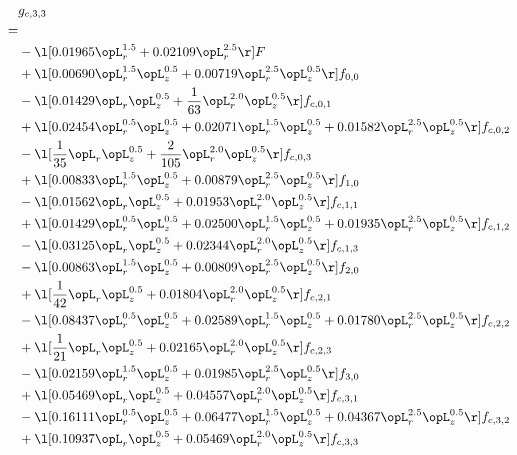 \begin{alignat}{2} 
\label{eq:g_33_0} 
& g_{c,3,3} \nonumber \\ 
 = \\ 
& - \l[  0.01965 \opL_r^{1.5} +  0.02109 \opL_r^{2.5}  \r] F \nonumber \\ 
& + \l[  0.00690 \opL_r^{1.5} \opL_z^{0.5} +  0.00719 \opL_r^{2.5} \opL_z^{0.5}  \r] f_{0,0} \nonumber \\ 
& - \l[  0.01429 \opL_r \opL_z^{0.5} + \frac{1}{63} \opL_r^{2.0} \opL_z^{0.5}  \r] f_{c,0,1} \nonumber \\ 
& + \l[  0.02454 \opL_r^{0.5} \opL_z^{0.5} +  0.02071 \opL_r^{1.5} \opL_z^{0.5} +  0.01582 \opL_r^{2.5} \opL_z^{0.5}  \r] f_{c,0,2} \nonumber \\ 
& - \l[ \frac{1}{35} \opL_r \opL_z^{0.5} + \frac{2}{105} \opL_r^{2.0} \opL_z^{0.5}  \r] f_{c,0,3} \nonumber \\ 
& + \l[  0.00833 \opL_r^{1.5} \opL_z^{0.5} +  0.00879 \opL_r^{2.5} \opL_z^{0.5}  \r] f_{1,0} \nonumber \\ 
& - \l[  0.01562 \opL_r \opL_z^{0.5} +  0.01953 \opL_r^{2.0} \opL_z^{0.5}  \r] f_{c,1,1} \nonumber \\ 
& + \l[  0.01429 \opL_r^{0.5} \opL_z^{0.5} +  0.02500 \opL_r^{1.5} \opL_z^{0.5} +  0.01935 \opL_r^{2.5} \opL_z^{0.5}  \r] f_{c,1,2} \nonumber \\ 
& - \l[  0.03125 \opL_r \opL_z^{0.5} +  0.02344 \opL_r^{2.0} \opL_z^{0.5}  \r] f_{c,1,3} \nonumber \\ 
& - \l[  0.00863 \opL_r^{1.5} \opL_z^{0.5} +  0.00809 \opL_r^{2.5} \opL_z^{0.5}  \r] f_{2,0} \nonumber \\ 
& + \l[ \frac{1}{42} \opL_r \opL_z^{0.5} +  0.01804 \opL_r^{2.0} \opL_z^{0.5}  \r] f_{c,2,1} \nonumber \\ 
& - \l[  0.08437 \opL_r^{0.5} \opL_z^{0.5} +  0.02589 \opL_r^{1.5} \opL_z^{0.5} +  0.01780 \opL_r^{2.5} \opL_z^{0.5}  \r] f_{c,2,2} \nonumber \\ 
& + \l[ \frac{1}{21} \opL_r \opL_z^{0.5} +  0.02165 \opL_r^{2.0} \opL_z^{0.5}  \r] f_{c,2,3} \nonumber \\ 
& - \l[  0.02159 \opL_r^{1.5} \opL_z^{0.5} +  0.01985 \opL_r^{2.5} \opL_z^{0.5}  \r] f_{3,0} \nonumber \\ 
& + \l[  0.05469 \opL_r \opL_z^{0.5} +  0.04557 \opL_r^{2.0} \opL_z^{0.5}  \r] f_{c,3,1} \nonumber \\ 
& - \l[  0.16111 \opL_r^{0.5} \opL_z^{0.5} +  0.06477 \opL_r^{1.5} \opL_z^{0.5} +  0.04367 \opL_r^{2.5} \opL_z^{0.5}  \r] f_{c,3,2} \nonumber \\ 
& + \l[  0.10937 \opL_r \opL_z^{0.5} +  0.05469 \opL_r^{2.0} \opL_z^{0.5}  \r] f_{c,3,3} \nonumber \\ 
\end{alignat} 


